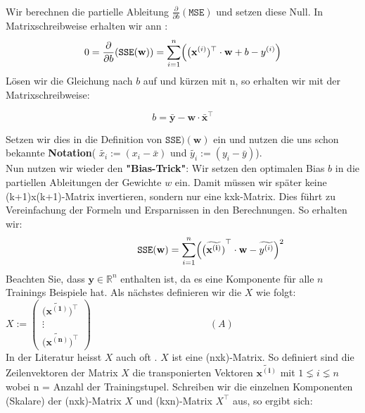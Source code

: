 \documentclass[12pt]{article}
\begin{document}
\\[0.2cm]
Wir berechnen die partielle Ableitung $ \frac{\partial}{\partial b}(\mathtt{MSE})$ und setzen diese Null. In Matrixschreibweise  erhalten wir ann :\\[0.2cm]
\begin{equation}
    0 = \frac{\partial}{\partial b}(\mathtt{SSE}(\mathbf{w})) =  \sum\limits_{i=1}^n \Bigl(\bigl(\mathbf{x}^{(i)})^\top \cdot \mathbf{w} + b - y^{(i)}\Bigr)
\end{equation}
Lösen wir die Gleichung nach $b$ auf und kürzen mit n,  so erhalten wir mit der Matrixschreibweise:
\begin{large}
\begin{equation}
    \label{eq:squared-error-3}
    b = \bar{\mathbf{y}}- \mathbf{w} \cdot \bar{\mathbf{x}}^\top    
\end{equation}
\end{large}
Setzen wir dies in die Definition von $\mathtt{SSE})(\mathbf{w}) $ ein und nutzen die uns schon bekannte \textbf{Notation}( 
 $ \widetilde{x_i} := (x_i - \bar{x}) $ und $ \widetilde{y_i} := (y_i - \bar{y})$). \\
Nun nutzen wir wieder den \textbf{"Bias-Trick"}: Wir setzen den optimalen Bias $b$ in die partiellen Ableitungen der Gewichte $w$ ein. Damit müssen wir später keine (k+1)x(k+1)-Matrix invertieren, sondern nur eine kxk-Matrix. Dies führt zu Vereinfachung der Formeln und  Ersparnissen in den Berechnungen. So erhalten wir:
\begin{equation}
  \hspace*{2.0cm}
  \label{eq:squared-error-4}
  \mathtt{SSE}(\mathbf{w}) = \sum\limits_{i=1}^n \Bigl(\bigl(\mathbf{\widetilde{{x}^{(i)}})}^\top \cdot \mathbf{w} - \widetilde{y^{(i)}}\Bigr)^2
\end{equation}
Beachten Sie, dass $\mathbf{y} \in \mathbb{R}^n$ enthalten ist, da es eine Komponente für alle $n$ Trainings Beispiele hat. Als nächstes definieren wir die {\color{blue}{Designmatrix}} $X$ wie folgt:
\\[0.3cm]
\hspace*{5.5cm}
$ X := \left(
  \begin{array}{c}
    \bigl(\mathbf{\widetilde{x^{(1)}}}\bigr)^\top \\
    \vdots \\
    \bigl(\mathbf{\widetilde{x^{(n)}}}\bigr)^\top
  \end{array}
  \right)   \qquad \qquad \qquad \qquad \qquad \qquad (A)
$   
\\[0.2cm]
In der Literatur heisst $X$ auch oft {\color{blue}{Feature Matrix}}. $X$ ist eine (nxk)-Matrix. So definiert sind die Zeilenvektoren der Matrix $X$ die transponierten Vektoren $ \mathbf{\widetilde{x^{(i)}}} $ mit $ 1 \lneq i \lneq n $  wobei n = Anzahl der Trainingstupel. Schreiben wir die einzelnen Komponenten (Skalare) der (nxk)-Matrix $X$ und (kxn)-Matrix  $X^\top$ aus, so ergibt sich: 
\end{document}
